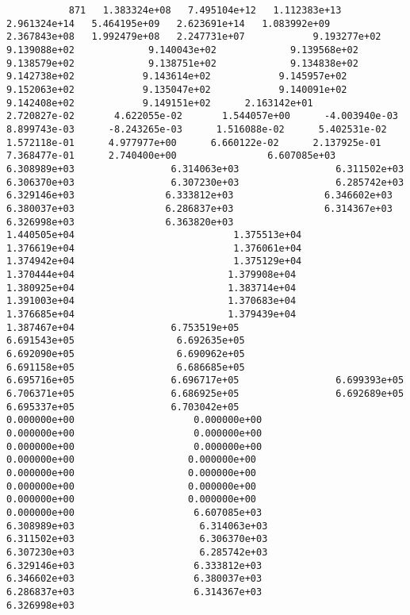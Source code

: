 \documentclass{article}
\begin{document}
{\tiny 
\begin{verbatim}
           871   1.383324e+08   7.495104e+12   1.112383e+13   2.961324e+14   5.464195e+09   2.623691e+14   1.083992e+09   2.367843e+08   1.992479e+08   2.247731e+07            9.193277e+02             9.139088e+02             9.140043e+02             9.139568e+02             9.138579e+02             9.138751e+02             9.134838e+02            9.142738e+02            9.143614e+02            9.145957e+02            9.152063e+02            9.135047e+02            9.140091e+02            9.142408e+02            9.149151e+02      2.163142e+01       2.720827e-02       4.622055e-02       1.544057e+00      -4.003940e-03       8.899743e-03      -8.243265e-03      1.516088e-02      5.402531e-02      1.572118e-01      4.977977e+00      6.660122e-02      2.137925e-01      7.368477e-01      2.740400e+00                6.607085e+03                 6.308989e+03                 6.314063e+03                 6.311502e+03                 6.306370e+03                 6.307230e+03                 6.285742e+03                6.329146e+03                6.333812e+03                6.346602e+03                6.380037e+03                6.286837e+03                6.314367e+03                6.326998e+03                6.363820e+03                           1.440505e+04                            1.375513e+04                            1.376619e+04                            1.376061e+04                            1.374942e+04                            1.375129e+04                            1.370444e+04                           1.379908e+04                           1.380925e+04                           1.383714e+04                           1.391003e+04                           1.370683e+04                           1.376685e+04                           1.379439e+04                           1.387467e+04                 6.753519e+05                  6.691543e+05                  6.692635e+05                  6.692090e+05                  6.690962e+05                  6.691158e+05                  6.686685e+05                 6.695716e+05                 6.696717e+05                 6.699393e+05                 6.706371e+05                 6.686925e+05                 6.692689e+05                 6.695337e+05                 6.703042e+05                    0.000000e+00                     0.000000e+00                     0.000000e+00                     0.000000e+00                     0.000000e+00                     0.000000e+00                     0.000000e+00                    0.000000e+00                    0.000000e+00                    0.000000e+00                    0.000000e+00                    0.000000e+00                    0.000000e+00                    0.000000e+00                    0.000000e+00                     6.607085e+03                      6.308989e+03                      6.314063e+03                      6.311502e+03                      6.306370e+03                      6.307230e+03                      6.285742e+03                     6.329146e+03                     6.333812e+03                     6.346602e+03                     6.380037e+03                     6.286837e+03                     6.314367e+03                     6.326998e+03                     
\end{verbatim}}
\end{document}

